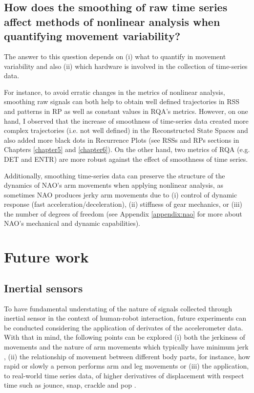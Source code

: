 \subsection*{How does the smoothing of raw time series affect 
	methods of nonlinear analysis when 
	quantifying movement variability?}

The answer to this question depends on 
(i) what to quantify in movement variability and also 
(ii) which hardware is involved in the collection of 
time-series data. 

For instance, to avoid erratic changes in the metrics
of nonlinear analysis, smoothing raw signals can both help
to obtain well defined trajectories in RSS and patterns in RP
as well as constant values in RQA's metrics.
However, on one hand, I observed that the increase of smoothness 
of time-series data created more complex trajectories 
(i.e. not well defined) in the Reconstructed State Spaces and 
also added more black dots in Recurrence Plots 
(see RSSs and RPs sections in Chapters \ref{chapter5} and \ref{chapter6}).
On the other hand, two metrics of RQA (e.g. DET and ENTR) 
are more robust against the effect of smoothness of time series.

Additionally, smoothing time-series data can preserve 
the structure of the dynamics of NAO's arm movements 
when applying nonlinear analysis, as sometimes NAO 
produces jerky arm movements due to  
(i) control of dynamic response (fast acceleration/deceleration), 
(ii) stiffness of gear mechanics, or 
(iii) the number of degrees of freedom
(see Appendix \ref{appendix:nao} for more about 
NAO's mechanical and dynamic capabilities).

\section{Future work}

\subsection*{Inertial sensors}
To have fundamental understating of the nature of signals collected 
through inertial sensor in the context of human-robot interaction,
future experiments can be conducted considering the application of 
derivates of the accelerometer data. 
With that in mind, the following points can be explored 
(i) both the jerkiness of movements and the 
nature of arm movements which typically have minimum 
jerk \citep{flash1985},
(ii) the relationship of movement between different body parts, 
for instance, how rapid or slowly a person performs arm and leg 
movements \citep{devries1982, mori2012} or (iii) 
the application, to real-world time series data, of higher derivatives 
of displacement with respect time such as jounce, snap, 
crackle and pop \citep{eager2016}.

